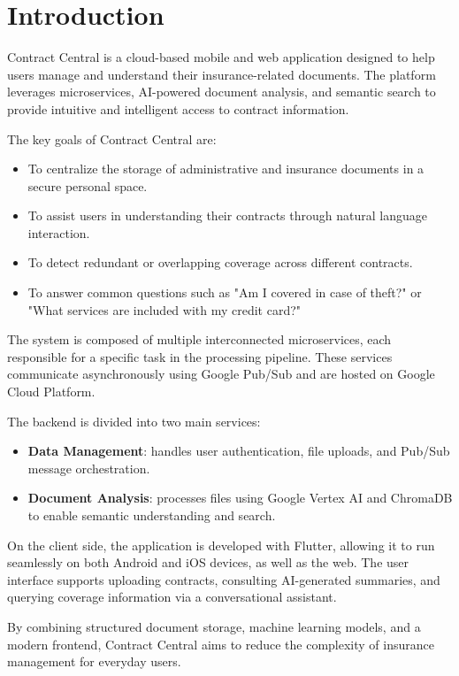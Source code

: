 \chapter{Introduction}
\begingroup
\setlength{\parindent}{0pt}
\setlength{\parskip}{0.5em}

Contract Central is a cloud-based mobile and web application designed to help users manage and understand their insurance-related documents. The platform leverages microservices, AI-powered document analysis, and semantic search to provide intuitive and intelligent access to contract information.

The key goals of Contract Central are:
\begin{itemize}
    \item To centralize the storage of administrative and insurance documents in a secure personal space.
    \item To assist users in understanding their contracts through natural language interaction.
    \item To detect redundant or overlapping coverage across different contracts.
    \item To answer common questions such as "Am I covered in case of theft?" or "What services are included with my credit card?"
\end{itemize}

The system is composed of multiple interconnected microservices, each responsible for a specific task in the processing pipeline. These services communicate asynchronously using Google Pub/Sub and are hosted on Google Cloud Platform.

The backend is divided into two main services:
\begin{itemize}
    \item \textbf{Data Management}: handles user authentication, file uploads, and Pub/Sub message orchestration.
    \item \textbf{Document Analysis}: processes files using Google Vertex AI and ChromaDB to enable semantic understanding and search.
\end{itemize}

On the client side, the application is developed with Flutter, allowing it to run seamlessly on both Android and iOS devices, as well as the web. The user interface supports uploading contracts, consulting AI-generated summaries, and querying coverage information via a conversational assistant.

By combining structured document storage, machine learning models, and a modern frontend, Contract Central aims to reduce the complexity of insurance management for everyday users.
\endgroup

